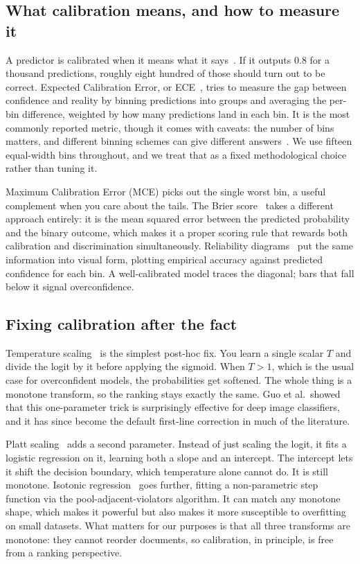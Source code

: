 \subsection{What calibration means, and how to measure it}
A predictor is calibrated when it means what it says~\cite{degroot1983}. If it
outputs 0.8 for a thousand predictions, roughly eight hundred of those should turn
out to be correct. Expected Calibration Error, or ECE~\cite{naeini2015}, tries to
measure the gap between confidence and reality by binning predictions into groups and
averaging the per-bin difference, weighted by how many predictions land in each bin.
It is the most commonly reported metric, though it comes with caveats: the number of
bins matters, and different binning schemes can give different
answers~\cite{nixon2019,kumar2019}. We use fifteen equal-width bins throughout, and
we treat that as a fixed methodological choice rather than tuning it.

Maximum Calibration Error (MCE) picks out the single worst bin, a useful complement
when you care about the tails. The Brier score~\cite{brier1950} takes a different
approach entirely: it is the mean squared error between the predicted probability and
the binary outcome, which makes it a proper scoring rule that rewards both
calibration and discrimination simultaneously. Reliability
diagrams~\cite{degroot1983,niculescu2005} put the same information into visual form,
plotting empirical accuracy against predicted confidence for each bin. A well-calibrated
model traces the diagonal; bars that fall below it signal overconfidence.

\subsection{Fixing calibration after the fact}
Temperature scaling~\cite{guo2017} is the simplest post-hoc fix. You learn a single
scalar $T$ and divide the logit by it before applying the sigmoid. When $T>1$, which
is the usual case for overconfident models, the probabilities get softened. The whole
thing is a monotone transform, so the ranking stays exactly the same. Guo et al.\
showed that this one-parameter trick is surprisingly effective for deep image
classifiers, and it has since become the default first-line correction in much of the
literature.

Platt scaling~\cite{platt1999} adds a second parameter. Instead of just scaling the
logit, it fits a logistic regression on it, learning both a slope and an intercept.
The intercept lets it shift the decision boundary, which temperature alone cannot do.
It is still monotone. Isotonic regression~\cite{zadrozny2002} goes further, fitting
a non-parametric step function via the pool-adjacent-violators algorithm. It can
match any monotone shape, which makes it powerful but also makes it more susceptible
to overfitting on small datasets. What matters for our purposes is that all three
transforms are monotone: they cannot reorder documents, so calibration, in principle,
is free from a ranking perspective.

